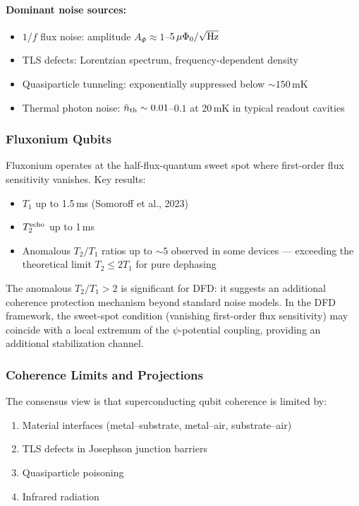 \documentclass[11pt,letterpaper]{article}
\begin{document}
\paragraph{Dominant noise sources:}
\begin{itemize}
\item $1/f$ flux noise: amplitude $A_\Phi \approx 1$--$5\,\mu\Phi_0/\sqrt{\rm Hz}$
\item TLS defects: Lorentzian spectrum, frequency-dependent density
\item Quasiparticle tunneling: exponentially suppressed below $\sim 150$\,mK
\item Thermal photon noise: $\bar{n}_{\rm th} \sim 0.01$--$0.1$ at
20\,mK in typical readout cavities
\end{itemize}

\subsubsection{Fluxonium Qubits}

Fluxonium operates at the half-flux-quantum sweet spot where first-order
flux sensitivity vanishes. Key results:
\begin{itemize}
\item $T_1$ up to 1.5\,ms (Somoroff et al., 2023)
\item $T_2^{\rm echo}$ up to 1\,ms
\item Anomalous $T_2/T_1$ ratios up to $\sim 5$ observed in some devices
--- exceeding the theoretical limit $T_2 \leq 2T_1$ for pure dephasing
\end{itemize}

The anomalous $T_2/T_1 > 2$ is significant for DFD: it suggests an
additional coherence protection mechanism beyond standard noise models.
In the DFD framework, the sweet-spot condition (vanishing first-order flux
sensitivity) may coincide with a local extremum of the $\psi$-potential
coupling, providing an additional stabilization channel.

\subsubsection{Coherence Limits and Projections}

The consensus view is that superconducting qubit coherence is limited by:
\begin{enumerate}
\item Material interfaces (metal--substrate, metal--air, substrate--air)
\item TLS defects in Josephson junction barriers
\item Quasiparticle poisoning
\item Infrared radiation
\end{enumerate}
\end{document}

